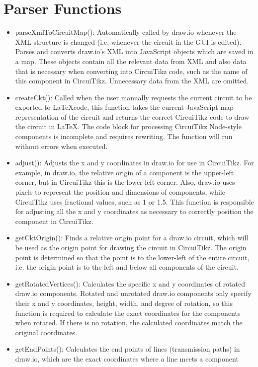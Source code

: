 \section{Parser Functions}\label{sec:parser-funcs}
\begin{itemize}
	\item parseXmlToCircuitMap(): Automatically called by draw.io whenever the XML structure is changed (i.e. whenever the circuit in the GUI is edited). Parses and converts draw.io's XML into JavaScript objects which are saved in a map. These objects contain all the relevant data from XML and also data that is necessary when converting into CircuiTikz code, such as the name of this component in CircuiTikz. Unnecessary data from the XML are omitted.
	\item createCkt(): Called when the user manually requests the current circuit to be exported to \LaTeX code, this function takes the current JavaScript map representation of the circuit and returns the correct CircuiTikz code to draw the circuit in \LaTeX. The code block for processing CircuiTikz Node-style components is incomplete and requires rewriting. The function will run without errors when executed.
	\item adjust(): Adjusts the x and y coordinates in draw.io for use in CircuiTikz. For example, in draw.io, the relative origin of a component is the upper-left corner, but in CircuiTikz this is the lower-left corner. Also, draw.io uses pixels to represent the position and dimensions of components, while CircuiTikz uses fractional values, such as 1 or 1.5. This function is responsible for adjusting all the x and y coordinates as necessary to correctly position the component in CircuiTikz.
	\item getCktOrigin(): Finds a relative origin point for a draw.io circuit, which will be used as the origin point for drawing the circuit in CircuiTikz. The origin point is determined so that the point is to the lower-left of the entire circuit, i.e. the origin point is to the left and below all components of the circuit.
	\item getRotatedVertices(): Calculates the specific x and y coordinates of rotated draw.io components. Rotated and unrotated draw.io components only specify their x and y coordinates, height, width, and degree of rotation, so this function is required to calculate the exact coordinates for the components when rotated. If there is no rotation, the calculated coordinates match the original coordinates.
	\item getEndPoints(): Calculates the end points of lines (transmission paths) in draw.io, which are the exact coordinates where a line meets a component
\end{itemize}

